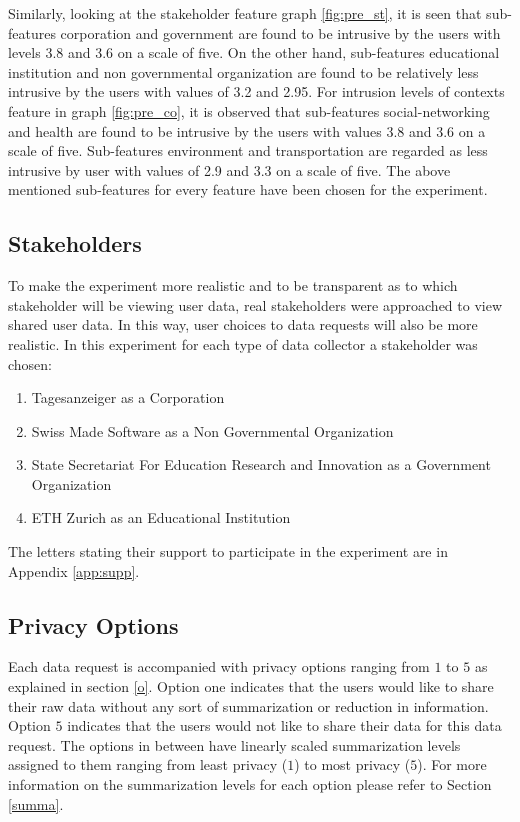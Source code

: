 Similarly, looking at the stakeholder feature graph \ref{fig:pre_st}, it is seen that sub-features  corporation and government are found to be intrusive by the users with levels 3.8 and 3.6 on a scale of five. On the other hand, sub-features educational institution and non governmental organization are found to be relatively less intrusive by the users with values of 3.2 and 2.95. For intrusion levels of contexts feature in graph \ref{fig:pre_co}, it is observed that sub-features social-networking and health are found to be intrusive by the users with values 3.8 and 3.6 on a scale of five. Sub-features environment and
transportation are regarded as less intrusive by user with values of 2.9 and 3.3 on a scale of five. The above mentioned sub-features for every feature have been chosen for the experiment.

\subsection{Stakeholders} \label{stk}

To make the experiment more realistic and to be transparent as to which stakeholder will be viewing user data, real stakeholders were approached to view shared user data. In this way, user choices to data requests will also be more realistic. In this experiment for each type of data collector a stakeholder was chosen:
\begin{enumerate}
    \item Tagesanzeiger as a Corporation
    \item Swiss Made Software as a Non Governmental Organization
    \item State Secretariat For Education Research and Innovation as a Government Organization
    \item ETH Zurich as an Educational Institution
\end{enumerate}

The letters stating their support to participate in the experiment are in Appendix \ref{app:supp}.

\subsection{Privacy Options} \label{options}

Each data request is accompanied with privacy options ranging from $1$ to $5$ as explained in section \ref{o}. Option one indicates that the users would like to
share their raw data without any sort of summarization or reduction in information. Option $5$ indicates that the users would not like to share their data for this data request.
The options in between have linearly scaled summarization levels assigned to them ranging from least privacy ($1$) to most privacy ($5$). For more information on the summarization levels for each option please refer to Section \ref{summa}. 

